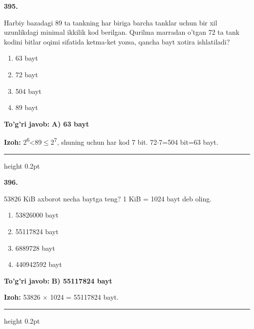 \documentclass[10pt,a4paper,oneside]{article}
\begin{document}
\noindent\textbf{\color{ink}395.}
\par
Harbiy bazadagi 89 ta tankning har biriga barcha tanklar uchun bir xil uzunlikdagi minimal ikkilik kod berilgan. Qurilma marradan o'tgan 72 ta tank kodini bitlar oqimi sifatida ketma-ket yozsa, qancha bayt xotira ishlatiladi?
\begin{enumerate}[label=\Alph*),leftmargin=9mm]
\item 63 bayt
\item 72 bayt
\item 504 bayt
\item 89 bayt
\end{enumerate}
\begin{tcolorbox}[enhanced,breakable,colback=teal!4,colframe=teal!50!black,boxrule=0.5pt,arc=1.1mm,left=3mm,right=3mm,top=1.7mm,bottom=1.7mm,before skip=2mm,after skip=2mm]
\textbf{\color{teal}To'g'ri javob:} \textbf{A) 63 bayt}
\par\smallskip
\textbf{Izoh:} 2\textsuperscript{6}\textless{}89\ensuremath{\leq}2\textsuperscript{7}, shuning uchun har kod 7 bit. 72\ensuremath{\cdot}7=504 bit=63 bayt.
\end{tcolorbox}
\vspace{2mm}\hrule height 0.2pt \vspace{3mm}

\noindent\textbf{\color{ink}396.}
\par
53826 KiB axborot necha baytga teng? 1 KiB = 1024 bayt deb oling.
\begin{enumerate}[label=\Alph*),leftmargin=9mm]
\item 53826000 bayt
\item 55117824 bayt
\item 6889728 bayt
\item 440942592 bayt
\end{enumerate}
\begin{tcolorbox}[enhanced,breakable,colback=teal!4,colframe=teal!50!black,boxrule=0.5pt,arc=1.1mm,left=3mm,right=3mm,top=1.7mm,bottom=1.7mm,before skip=2mm,after skip=2mm]
\textbf{\color{teal}To'g'ri javob:} \textbf{B) 55117824 bayt}
\par\smallskip
\textbf{Izoh:} 53826 \ensuremath{\times} 1024 = 55117824 bayt.
\end{tcolorbox}
\vspace{2mm}\hrule height 0.2pt \vspace{3mm}
\end{document}
